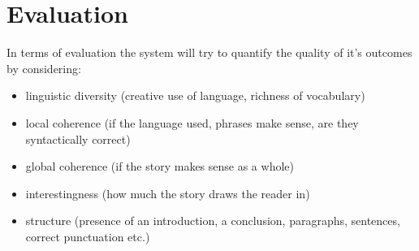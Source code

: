 \documentclass[a4paper, 12pt, notitlepage]{article}
\begin{document}
\section*{Evaluation}

In terms of evaluation the system will try to quantify the quality of it's
outcomes by considering:

\begin{itemize}		
  \item linguistic diversity (creative use of language, richness of vocabulary)
  \item local coherence (if the language used, phrases make sense, are they syntactically correct)
  \item global coherence (if the story makes sense as a whole)
  \item interestingness (how much the story draws the reader in)
  \item structure (presence of an introduction, a conclusion, paragraphs, sentences, correct punctuation etc.)
\end{itemize}		
\end{document}
